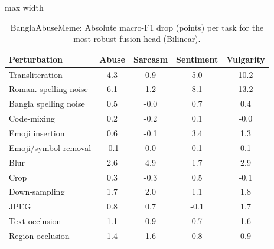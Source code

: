 \begin{table}[t]
\centering
\small
\caption{BanglaAbuseMeme: Absolute macro-F1 drop (points) per task for the most robust fusion head (Bilinear).}
\label{tab:rob_task_fine_banglaabusememe}
\begin{adjustbox}{max width=\columnwidth}
\begin{tabular}{lcccc}
\toprule
Perturbation & Abuse & Sarcasm & Sentiment & Vulgarity \\
\midrule
Transliteration & 4.3 & 0.9 & 5.0 & 10.2 \\
Roman. spelling noise & 6.1 & 1.2 & 8.1 & 13.2 \\
Bangla spelling noise & 0.5 & -0.0 & 0.7 & 0.4 \\
Code-mixing & 0.2 & -0.2 & 0.1 & -0.0 \\
Emoji insertion & 0.6 & -0.1 & 3.4 & 1.3 \\
Emoji/symbol removal & -0.1 & 0.0 & 0.1 & 0.1 \\
Blur & 2.6 & 4.9 & 1.7 & 2.9 \\
Crop & 0.3 & -0.3 & 0.5 & -0.1 \\
Down-sampling & 1.7 & 2.0 & 1.1 & 1.8 \\
JPEG & 0.8 & 0.7 & -0.1 & 1.7 \\
Text occlusion & 1.1 & 0.9 & 0.7 & 1.6 \\
Region occlusion & 1.4 & 1.6 & 0.8 & 0.9 \\
\bottomrule
\end{tabular}
\end{adjustbox}
\end{table}
